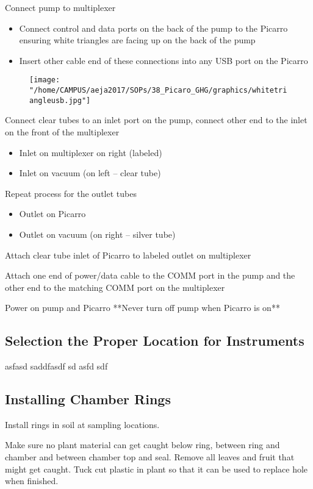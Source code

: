 \documentclass[12pt]{../SOP3}\usepackage[]{graphicx}\usepackage[]{color}
\begin{document}
\NP Connect pump to multiplexer
\begin{itemize}
\item Connect control and data ports on the back of the pump to the Picarro ensuring white triangles are facing up on the back of the pump
\item Insert other cable end of these connections into any USB port on the Picarro
\end{itemize}

\begin{figure}
\texttt{[image: "/home/CAMPUS/aeja2017/SOPs/38\_Picaro\_GHG/graphics/whitetriangleusb.jpg"]}
\end{figure}

\NP Connect clear tubes to an inlet port on the pump, connect other end to the inlet on the front of the multiplexer
\begin{itemize}
\item Inlet on multiplexer on right (labeled)
\item Inlet on vacuum (on left -- clear tube)
\end{itemize}

\NP Repeat process for the outlet tubes
\begin{itemize}
\item Outlet on Picarro
\item Outlet on vacuum (on right -- silver tube)
\end{itemize}

\NP Attach clear tube inlet of Picarro to labeled outlet on multiplexer

\NP Attach one end of power/data cable to the COMM port in the pump and the other end to the matching COMM port on the multiplexer

\NP Power on pump and Picarro **Never turn off pump when Picarro is on**

\subsection*{Selection the Proper Location for Instruments}

\NP asfasd saddfasdf sd asfd sdf

\subsection*{Installing Chamber Rings}

\NP Install rings in soil at sampling locations. 

\NP Make sure no plant material can get caught below ring, between ring and chamber and between chamber top and seal. Remove all leaves and fruit that might get caught. Tuck cut plastic in plant so that it can be used to replace hole when finished.
\end{document}
